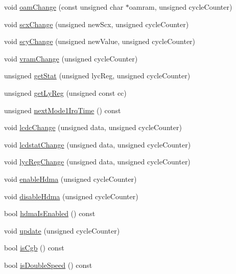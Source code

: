 \begin{DoxyCompactItemize}
void \hyperlink{classgambatte_1_1LCD_a2198ab07a1eb038f820141c39c312baa}{oam\+Change} (const unsigned char $\ast$oamram, unsigned cycle\+Counter)
\item 
void \hyperlink{classgambatte_1_1LCD_aaac41f27fac136de6a13d7f92ccf64fa}{scx\+Change} (unsigned new\+Scx, unsigned cycle\+Counter)
\item 
void \hyperlink{classgambatte_1_1LCD_a50d315bf6aa30e6405fa0c9ff92494f2}{scy\+Change} (unsigned new\+Value, unsigned cycle\+Counter)
\item 
void \hyperlink{classgambatte_1_1LCD_a3ccafb8445bec07467e96f7bb52c6db9}{vram\+Change} (unsigned cycle\+Counter)
\item 
unsigned \hyperlink{classgambatte_1_1LCD_a547519b1c436bcc02eef931c6cab72db}{get\+Stat} (unsigned lyc\+Reg, unsigned cycle\+Counter)
\item 
unsigned \hyperlink{classgambatte_1_1LCD_a666684dc42954d168509c1b279823607}{get\+Ly\+Reg} (unsigned const cc)
\item 
unsigned \hyperlink{classgambatte_1_1LCD_a9e4fc2713092218b47440166325ef0ca}{next\+Mode1\+Irq\+Time} () const
\item 
void \hyperlink{classgambatte_1_1LCD_a33575ec173dc95fecf92c4e0a0ae6531}{lcdc\+Change} (unsigned data, unsigned cycle\+Counter)
\item 
void \hyperlink{classgambatte_1_1LCD_ade4979ec2f00ae8201c30a83020b289d}{lcdstat\+Change} (unsigned data, unsigned cycle\+Counter)
\item 
void \hyperlink{classgambatte_1_1LCD_a92e048c713983a217e35060dd8f50556}{lyc\+Reg\+Change} (unsigned data, unsigned cycle\+Counter)
\item 
void \hyperlink{classgambatte_1_1LCD_a86dc5a20358fa465677c0735f88b8dca}{enable\+Hdma} (unsigned cycle\+Counter)
\item 
void \hyperlink{classgambatte_1_1LCD_a2e786aa0588f0a1ce49aa602c07a61e3}{disable\+Hdma} (unsigned cycle\+Counter)
\item 
bool \hyperlink{classgambatte_1_1LCD_a9eeebbc4225c4fc1b3893d0373d3d315}{hdma\+Is\+Enabled} () const
\item 
void \hyperlink{classgambatte_1_1LCD_a457f2dd7c97b98c35fc196a1a4259d7c}{update} (unsigned cycle\+Counter)
\item 
bool \hyperlink{classgambatte_1_1LCD_a6e2891b1172f88fd84ce0d15250e35db}{is\+Cgb} () const
\item 
bool \hyperlink{classgambatte_1_1LCD_a603015bdd0d5fdb40f60d3b678706232}{is\+Double\+Speed} () const
\end{DoxyCompactItemize}
